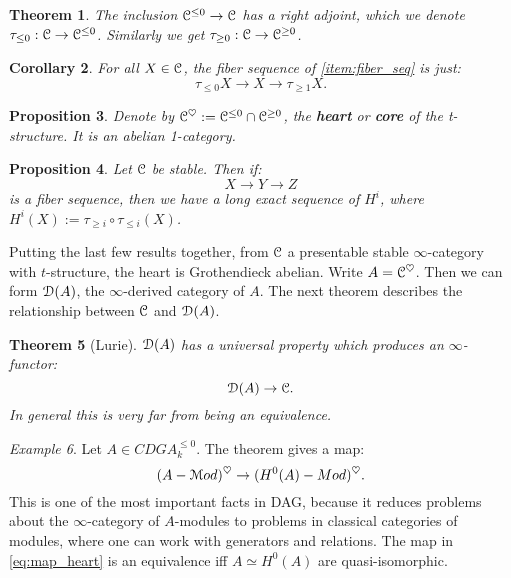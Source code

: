 \documentclass[10pt,a4paper,reqno,oneside]{book} %
\theoremstyle{plain}
\newtheorem{thm}{Theorem}[section]
\newtheorem{prop}[thm]{Proposition}
\newtheorem{cor}[thm]{Corollary}
\theoremstyle{definition}
\theoremstyle{remark}
\newtheorem{eg}[thm]{Example}
\numberwithin{equation}{section}
\begin{document}
\begin{thm}
The inclusion $\mathcal C^{\leq 0} \to \mathcal C$ has a right adjoint, which we denote $\tau_{\leq 0} : \mathcal C \to \mathcal C^{\leq 0}$. Similarly
we get $\tau_{\geq 0} : \mathcal C \to \mathcal C^{\geq 0}$.
\end{thm}

\begin{cor}
For all $X \in \mathcal C$, the fiber sequence of \ref{item:fiber_seq} is just:
\[	\tau_{\leq 0} X \to X \to \tau_{\geq 1} X.	\]
\end{cor}

\begin{prop}
Denote by $\mathcal C^{\heartsuit} := \mathcal C^{\leq 0} \cap \mathcal C^{\geq 0}$, the \textbf{heart} or \textbf{core} of the t-structure. 
It is an abelian 1-category.
\end{prop}

\begin{prop}
\label{prop:stable_les_homology}
Let $\mathcal C$ be stable. Then if:
\[	X \to Y \to Z	\]
is a fiber sequence, then we have a long exact sequence of $H^i$, where $H^i(X) := \tau_{\geq i} \circ \tau_{\leq i} (X)$.
\end{prop}

Putting the last few results together, from $\mathcal C$ a presentable stable $\infty$-category with $t$-structure, the heart 
is Grothendieck abelian. Write $A = \mathcal C^{\heartsuit}$. Then we can form $\mathcal D(A)$, the $\infty$-derived category of $A$.
The next theorem describes the relationship between $\mathcal C$ and $\mathcal D(A)$.

\begin{thm}[Lurie]
$\mathcal D(A)$ has a universal property which produces an $\infty$-functor:
\[	\mathcal D(A) \to \mathcal C.	\]
In general this is very far from being an equivalence.
\end{thm}

\begin{eg}
Let $A \in CDGA^{\leq 0}_k$. The theorem gives a map:
\begin{equation}
\label{eq:map_heart}
	(A-\mathcal M od)^{\heartsuit} \to  (H^0(A)-Mod)^{\heartsuit}.
\end{equation}
This is one of the most important facts
in DAG, because it reduces problems about the $\infty$-category of $A$-modules to problems in classical categories of modules,
where one can work with generators and relations. The map in \ref{eq:map_heart} is an equivalence iff $A \simeq H^0(A)$ 
are quasi-isomorphic.
\end{eg}
\end{document}
